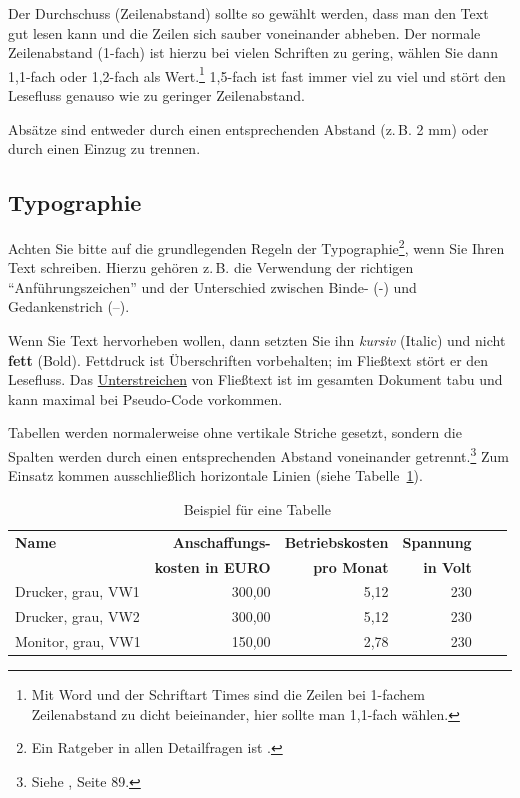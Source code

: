 \documentclass[a4paper,11pt,headings=normal]{scrartcl}
\begin{document}
Der Durchschuss (Zeilenabstand) sollte so gewählt werden, dass man den Text gut lesen kann und die Zeilen sich sauber voneinander abheben. Der normale Zeilenabstand (1-fach) ist hierzu bei vielen Schriften zu gering, wählen Sie dann 1,1-fach oder 1,2-fach als Wert.\footnote{Mit Word und der Schriftart Times sind die Zeilen bei 1-fachem Zeilenabstand zu dicht beieinander, hier sollte man 1,1-fach wählen.} 1,5-fach ist fast immer viel zu viel und stört den Lesefluss genauso wie zu geringer Zeilenabstand.

Absätze sind entweder durch einen entsprechenden Abstand (z.\,B. 2 mm) oder durch einen Einzug zu trennen.

\subsection{Typographie}
Achten Sie bitte auf die grundlegenden Regeln der Typographie\footnote{Ein Ratgeber in allen Detailfragen ist \autocite{Forssman2002}.}, wenn Sie Ihren Text schreiben. Hierzu gehören z.\,B. die Verwendung der richtigen "`Anführungszeichen"' und der Unterschied zwischen Binde- (-) und Gedankenstrich (--).

Wenn Sie Text hervorheben wollen, dann setzten Sie ihn \textit{kursiv} (Italic) und nicht \textbf{fett} (Bold). Fettdruck ist Überschriften vorbehalten; im Fließtext stört er den Lesefluss. Das \underline{Unterstreichen} von Fließtext ist im gesamten Dokument tabu und kann maximal bei Pseudo-Code vorkommen.

Tabellen werden normalerweise ohne vertikale Striche gesetzt, sondern die Spalten werden durch einen entsprechenden Abstand voneinander getrennt.\footnote{Siehe \autocite{Willberg1999}, Seite 89.} Zum Einsatz kommen ausschließlich horizontale Linien (siehe Tabelle~\ref{tabellenbeispiel}).

\begin{table}
\centering
\begin{tabular}{l r r r r r}
\toprule
\textbf{Name} & \textbf{Anschaffungs-} & \textbf{Betriebskosten} & \textbf{Spannung}  \\
& \textbf{kosten in EURO} & \textbf{pro Monat} & \textbf{in Volt} \\
\midrule
Drucker, grau, VW1 &    300,00 &   5,12 & 230  \\
Drucker, grau, VW2 &    300,00 &   5,12 & 230  \\
Monitor, grau, VW1 &    150,00 &   2,78 & 230  \\
\bottomrule
\end{tabular}
\caption{Beispiel für eine Tabelle}
\label{tabellenbeispiel}
\end{table}
\end{document}
